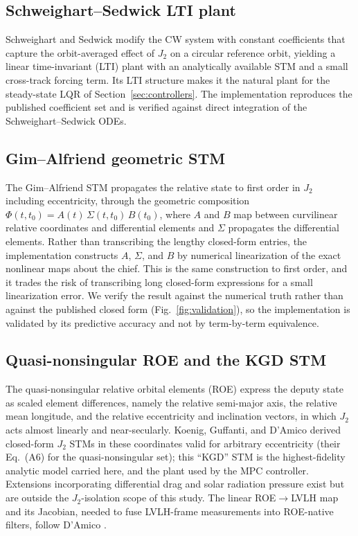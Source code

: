 \subsection{Schweighart--Sedwick LTI plant}

Schweighart and Sedwick \cite{schweighart2002highfidelity,
schweighart2001thesis} modify the CW system with constant coefficients
that capture the orbit-averaged effect of $J_2$ on a circular reference
orbit, yielding a linear time-invariant (LTI) plant with an analytically
available STM and a small cross-track forcing term. Its LTI structure makes
it the natural plant for the steady-state LQR of
Section~\ref{sec:controllers}. The implementation reproduces the published
coefficient set and is verified against direct integration of the
Schweighart--Sedwick ODEs.

\subsection{Gim--Alfriend geometric STM}

The Gim--Alfriend STM \cite{gim2003state,gim2005equinoctial,
alfriend2010formation} propagates the relative state to first order in
$J_2$ including eccentricity, through the geometric composition
$\Phi(t,t_0) = A(t)\,\Sigma(t,t_0)\,B(t_0)$, where $A$ and $B$ map between
curvilinear relative coordinates and differential elements and $\Sigma$
propagates the differential elements. Rather than transcribing the lengthy
closed-form entries, the implementation constructs $A$, $\Sigma$, and $B$
by numerical linearization of the exact nonlinear maps about the chief.
This is the same construction to first order, and it trades the risk of
transcribing long closed-form expressions for a small linearization error.
We verify the result against the numerical truth rather than against the
published closed form (Fig.~\ref{fig:validation}), so the implementation is
validated by its predictive accuracy and not by term-by-term equivalence.

\subsection{Quasi-nonsingular ROE and the KGD STM}

The quasi-nonsingular relative orbital elements (ROE)
\cite{damico2010thesis,damico2006proximity,sullivan2017survey} express the
deputy state as scaled element differences, namely the relative semi-major
axis, the relative mean longitude, and the relative eccentricity and
inclination vectors, in which $J_2$ acts almost linearly and near-secularly.
Koenig, Guffanti, and D'Amico \cite{koenig2017stm} derived closed-form
$J_2$ STMs in these coordinates valid for arbitrary eccentricity (their
Eq.~(A6) for the quasi-nonsingular set); this ``KGD'' STM is the
highest-fidelity analytic model carried here, and the plant used by the MPC
controller. Extensions incorporating differential drag and solar radiation
pressure exist \cite{gaias2015drag,guffanti2019srp} but are outside the
$J_2$-isolation scope of this study. The linear ROE$\to$LVLH map and its
Jacobian, needed to fuse LVLH-frame measurements into ROE-native filters,
follow D'Amico \cite{damico2010thesis}.

